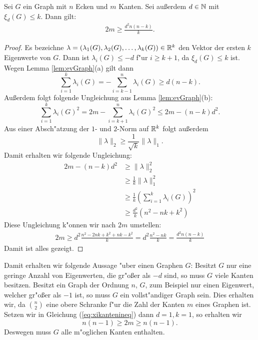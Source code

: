   \begin{theorem}
    Sei $G$ ein Graph mit $n$ Ecken und $m$ Kanten. Sei au{\ss}erdem $d\in {\mathbb{N}}$ mit $\xi_d(G) \leq k$. Dann gilt:
    \begin{align}
      2m \geq \frac{d^{2}n(n-k)}{k}.
      \label{eq:xikantenineq}
    \end{align}
    \label{thm:xikantenschranke}
  \end{theorem}

  \begin{proof}
    Es bezeichne $\lambda = (\lambda_{1}(G),\lambda_{2}(G), \dots , \lambda_{k}(G))\in {\mathbb{R}}^{k}$ den Vektor der ersten $k$ Eigenwerte von $G$. Dann ist $\lambda_{i}(G) \leq -d$ f"ur $i \geq k+1$, da $\xi_{d}(G) \leq k$ ist.
    Wegen Lemma \ref{lem:evGraph}(a) gilt dann 
    $$
    \sum\limits_{i=1}^{k} \lambda_{i}(G) = - \sum\limits_{i=k-1}^{n} \lambda_{i}(G) \geq d(n-k).
    $$
    Au{\ss}erdem folgt folgende Ungleichung aus Lemma \ref{lem:evGraph}(b):
    $$ \sum\limits_{i=1}^{k} \lambda_{i}(G)^{2} = 2m - \sum\limits_{i=k+1}^{n} \lambda_{i}(G) ^{2} \leq 2m - (n-k)d^{2}.$$
    Aus einer Absch"atzung der $1$- und $2$-Norm auf ${\mathbb{R}}^{k}$ folgt au{\ss}erdem 
    $$\| \lambda \|_{2} \geq \frac{1}{\sqrt{k}} \|\lambda\|_{1}.$$
    Damit erhalten wir folgende Ungleichung:
    \begin{align*}
      2m - (n-k)d^{2} &\geq \| \lambda \| _{2}^{2} \\
      & \geq \frac{1}{k} \| \lambda \| _1^{2} \\
      & \geq \frac{1}{k} ( \sum\limits_{i=1}^{k} \lambda_{i}(G))^{2} \\
      & \geq \frac{d^{2}}{k}(n^{2}-nk+k^{2})
    \end{align*}
    Diese Ungleichung k"onnen wir nach $2m$ umstellen:
    \begin{align*}
      2m \geq d^{2}\frac{n^{2}-2nk + k^{2}+ nk - k^{2} }{k} = d^{2}\frac{n^{2}-nk}{k} = \frac{d^{2}n(n-k)}{k}
    \end{align*}
    Damit ist alles gezeigt. 
  \end{proof}
  Damit erhalten wir folgende Aussage "uber einen Graphen $G$: Besitzt $G$ nur eine geringe Anzahl von Eigenwerten, die gr"o{\ss}er als $-d$ sind, so muss $G$ viele Kanten besitzen. Besitzt ein Graph der Ordnung $n$, $G$, zum Beispiel nur einen Eigenwert, welcher gr"o{\ss}er als $-1$ ist, so muss $G$ ein vollst"andiger Graph sein. 
  Dies erhalten wir, da $\binom{n}{2}$ eine obere Schranke f"ur die Zahl der Kanten $m$ eines Graphen ist. Setzen wir in Gleichung (\ref{eq:xikantenineq}) dann $d=1, k=1$, so erhalten wir 
  \begin{equation*}
    n(n-1) \geq 2m \geq n(n-1).
  \end{equation*}
  Deswegen muss  $G$ alle m"oglichen Kanten enthalten.

